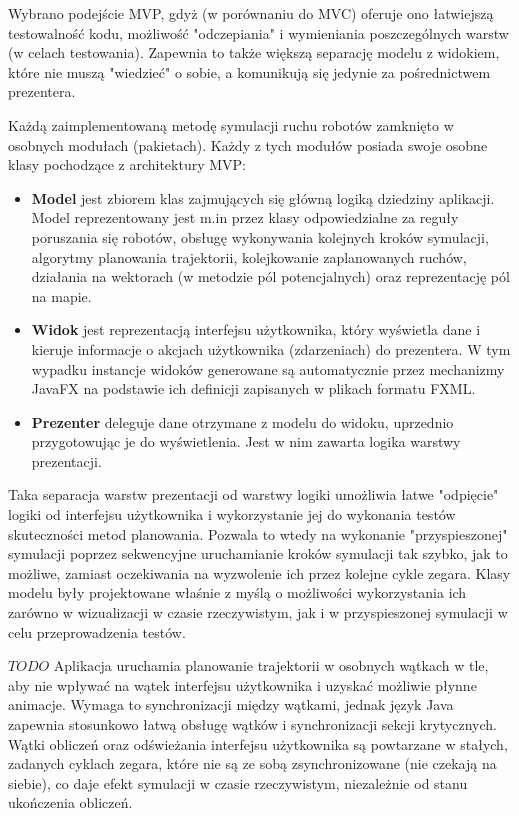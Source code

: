 Wybrano podejście MVP, gdyż (w porównaniu do MVC) oferuje ono łatwiejszą testowalność kodu, możliwość "odczepiania" i wymieniania poszczególnych warstw (w celach testowania). Zapewnia to także większą separację modelu z widokiem, które nie muszą "wiedzieć" o sobie, a komunikują się jedynie za pośrednictwem prezentera.

Każdą zaimplementowaną metodę symulacji ruchu robotów zamknięto w osobnych modułach (pakietach). Każdy z tych modułów posiada swoje osobne klasy pochodzące z architektury MVP:
\begin{itemize}
	\item {\bf Model} jest zbiorem klas zajmujących się główną logiką dziedziny aplikacji. Model reprezentowany jest m.in przez klasy odpowiedzialne za reguły poruszania się robotów, obsługę wykonywania kolejnych kroków symulacji, algorytmy planowania trajektorii, kolejkowanie zaplanowanych ruchów, działania na wektorach (w metodzie pól potencjalnych) oraz reprezentację pól na mapie.
	\item {\bf Widok} jest reprezentacją interfejsu użytkownika, który wyświetla dane i kieruje informacje o akcjach użytkownika (zdarzeniach) do prezentera. W tym wypadku instancje widoków generowane są automatycznie przez mechanizmy JavaFX na podstawie ich definicji zapisanych w plikach formatu FXML.
	\item {\bf Prezenter} deleguje dane otrzymane z modelu do widoku, uprzednio przygotowując je do wyświetlenia. Jest w nim zawarta logika warstwy prezentacji.
\end{itemize}

Taka separacja warstw prezentacji od warstwy logiki umożliwia łatwe "odpięcie" logiki od interfejsu użytkownika i wykorzystanie jej do wykonania testów skuteczności metod planowania. Pozwala to wtedy na wykonanie "przyspieszonej" symulacji poprzez sekwencyjne uruchamianie kroków symulacji tak szybko, jak to możliwe, zamiast oczekiwania na wyzwolenie ich przez kolejne cykle zegara.
Klasy modelu były projektowane właśnie z myślą o możliwości wykorzystania ich zarówno w wizualizacji w czasie rzeczywistym, jak i w przyspieszonej symulacji w celu przeprowadzenia testów.

$TODO$
Aplikacja uruchamia planowanie trajektorii w osobnych wątkach w tle, aby nie wpływać na wątek interfejsu użytkownika i uzyskać możliwie płynne animacje. Wymaga to synchronizacji między wątkami, jednak język Java zapewnia stosunkowo łatwą obsługę wątków i synchronizacji sekcji krytycznych. Wątki obliczeń oraz odświeżania interfejsu użytkownika są powtarzane w stałych, zadanych cyklach zegara, które nie są ze sobą zsynchronizowane (nie czekają na siebie), co daje efekt symulacji w czasie rzeczywistym, niezależnie od stanu ukończenia obliczeń.

